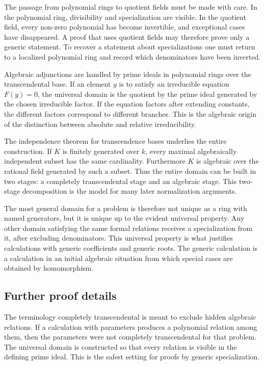 \documentclass[12pt]{article}
\begin{document}
The passage from polynomial rings to quotient fields must be made with care. In the polynomial ring,
divisibility and specialization are visible. In the quotient field, every non-zero polynomial has
become invertible, and exceptional cases have disappeared. A proof that uses quotient fields may
therefore prove only a generic statement. To recover a statement about specializations one must
return to a localized polynomial ring and record which denominators have been inverted.

Algebraic adjunctions are handled by prime ideals in polynomial rings over the transcendental base.
If an element \(y\) is to satisfy an irreducible equation \(F(y)=0\), the universal domain is the
quotient by the prime ideal generated by the chosen irreducible factor. If the equation factors
after extending constants, the different factors correspond to different branches. This is the
algebraic origin of the distinction between absolute and relative irreducibility.

The independence theorem for transcendence bases underlies the entire construction. If \(K\) is
finitely generated over \(k\), every maximal algebraically independent subset has the same
cardinality. Furthermore \(K\) is algebraic over the rational field generated by such a subset. Thus
the entire domain can be built in two stages: a completely transcendental stage and an algebraic
stage. This two-stage decomposition is the model for many later normalization arguments.

The most general domain for a problem is therefore not unique as a ring with named generators, but
it is unique up to the evident universal property. Any other domain satisfying the same formal
relations receives a specialization from it, after excluding denominators. This universal property
is what justifies calculations with generic coefficients and generic roots. The generic calculation
is a calculation in an initial algebraic situation from which special cases are obtained by
homomorphism.


\subsection{Further proof details}

The terminology completely transcendental is meant to exclude hidden algebraic relations. If a
calculation with parameters produces a polynomial relation among them, then the parameters were not
completely transcendental for that problem. The universal domain is constructed so that every
relation is visible in the defining prime ideal. This is the safest setting for proofs by generic
specialization.
\end{document}
